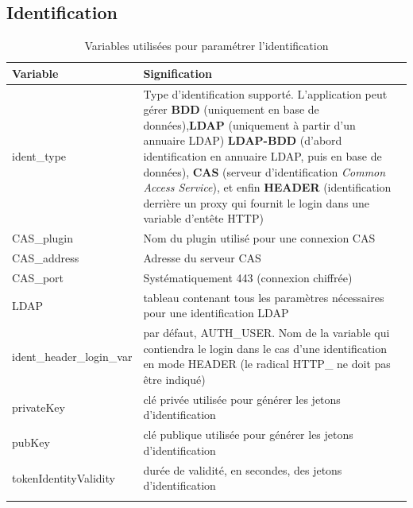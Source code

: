 \subsection{Identification}\label{paramident}
\begin{longtable}{|p{5cm}|p{8cm}|}
\hline
\textbf{Variable} & \textbf{Signification} \\
\hline
\endhead
ident\_type & Type d'identification supporté. L'application peut gérer \textbf{BDD} (uniquement en base de données),\textbf{LDAP} (uniquement à partir d'un annuaire LDAP) \textbf{LDAP-BDD} (d'abord identification en annuaire LDAP, puis en base de données), \textbf{CAS} (serveur d'identification \textit{Common Access Service}), et enfin \textbf{HEADER} (identification derrière un proxy qui fournit le login dans une variable d'entête HTTP)\\
\hline
CAS\_plugin & Nom du plugin utilisé pour une connexion CAS \\
\hline
CAS\_address & Adresse du serveur CAS\\
\hline
CAS\_port & Systématiquement 443 (connexion chiffrée)\\
\hline
LDAP & tableau contenant tous les paramètres nécessaires pour une identification LDAP \\
\hline
ident\_header\_login\_var & par défaut, AUTH\_USER. Nom de la variable qui contiendra le login dans le cas d'une identification en mode HEADER (le radical HTTP\_  ne doit pas être indiqué) \\
\hline
privateKey & clé privée utilisée pour générer les jetons d'identification \\
\hline
pubKey & clé publique utilisée pour générer les jetons d'identification \\
\hline
tokenIdentityValidity & durée de validité, en secondes, des jetons d'identification\\
\hline
\caption{Variables utilisées pour paramétrer l'identification}
\end{longtable}

